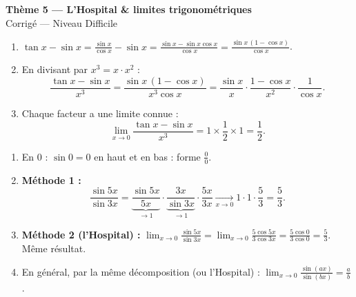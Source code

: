 \documentclass[11pt,a4paper]{article}
\begin{document}
\begin{center}
{\Large\bfseries\color{primarydark}Thème 5 — L'Hospital \& limites trigonométriques}\\[2pt]
{\large\color{excol}Corrigé — Niveau Difficile}
\end{center}
\vspace{6pt}

\begin{correction}
\begin{enumerate}[label=\alph*),leftmargin=2em,itemsep=3pt]
  \item $\displaystyle\tan x-\sin x=\frac{\sin x}{\cos x}-\sin x=\frac{\sin x-\sin x\cos x}{\cos x}
        =\frac{\sin x\,(1-\cos x)}{\cos x}$.
  \item En divisant par $x^3=x\cdot x^2$ :
        \[ \frac{\tan x-\sin x}{x^3}=\frac{\sin x\,(1-\cos x)}{x^3\cos x}
        =\frac{\sin x}{x}\cdot\frac{1-\cos x}{x^2}\cdot\frac{1}{\cos x}. \]
  \item Chaque facteur a une limite connue :
        \[ \lim_{x\to 0}\frac{\tan x-\sin x}{x^3}=1\times\frac12\times 1=\frac12. \]
\end{enumerate}
\end{correction}

\begin{correction}
\begin{enumerate}[label=\alph*),leftmargin=2em,itemsep=3pt]
  \item En $0$ : $\sin 0=0$ en haut et en bas : forme $\frac00$.
  \item \textbf{Méthode 1 :}
        \[ \frac{\sin 5x}{\sin 3x}=\underbrace{\frac{\sin 5x}{5x}}_{\to 1}\cdot\underbrace{\frac{3x}{\sin 3x}}_{\to 1}\cdot\frac{5x}{3x}
        \xrightarrow[x\to0]{}1\cdot 1\cdot\frac53=\frac53. \]
  \item \textbf{Méthode 2 (l'Hospital) :} $\displaystyle\lim_{x\to 0}\frac{\sin 5x}{\sin 3x}=\lim_{x\to 0}\frac{5\cos 5x}{3\cos 3x}=\frac{5\cos 0}{3\cos 0}=\frac53$. Même résultat.
  \item En général, par la même décomposition (ou l'Hospital) :
        $\displaystyle\lim_{x\to 0}\frac{\sin(ax)}{\sin(bx)}=\frac{a}{b}$.
\end{enumerate}
\end{correction}
\end{document}
